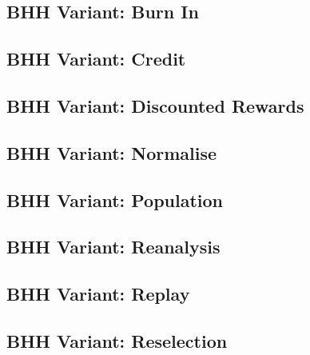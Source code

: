 \subsection{BHH Variant: Burn In}
\label{sec:experiments:bhh_variant_burn_in}

\subsection{BHH Variant: Credit}
\label{sec:experiments:bhh_variant_credit}

\subsection{BHH Variant: Discounted Rewards}
\label{sec:experiments:bhh_variant_discounted_rewards}

\subsection{BHH Variant: Normalise}
\label{sec:experiments:bhh_variant_normalise}

\subsection{BHH Variant: Population}
\label{sec:experiments:bhh_variant_population}

\subsection{BHH Variant: Reanalysis}
\label{sec:experiments:bhh_variant_reanalysis}

\subsection{BHH Variant: Replay}
\label{sec:experiments:bhh_variant_replay}

\subsection{BHH Variant: Reselection}
\label{sec:experiments:bhh_variant_reselection}

